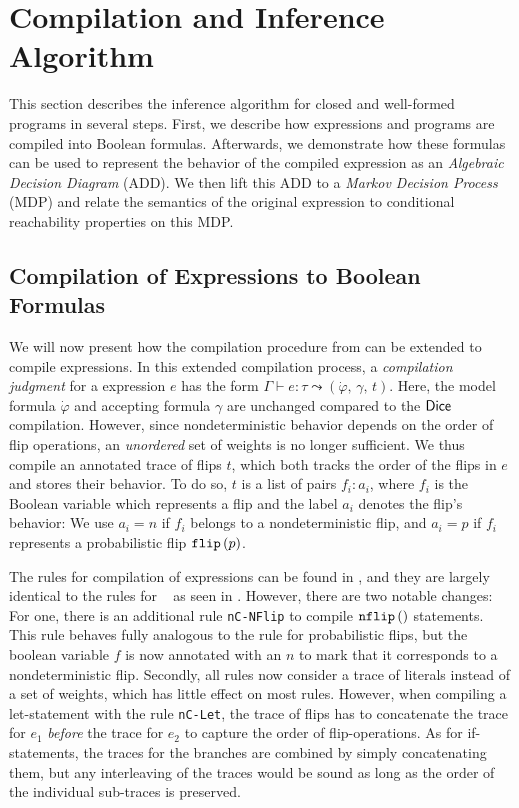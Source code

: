 


\section{Compilation and Inference Algorithm}\label{sec:inference}
This section describes the inference algorithm for closed and well-formed \NDICE programs in several steps.
First, we describe how \NDICE expressions and programs are compiled into Boolean formulas. 
Afterwards, we demonstrate how these formulas can be used to represent the behavior of the compiled expression as an \textit{Algebraic Decision Diagram} (ADD).
We then lift this ADD to a \textit{Markov Decision Process} (MDP) and relate the semantics of the original \NDICE expression to conditional reachability properties on this MDP.

\subsection{Compilation of \NDICE Expressions to Boolean Formulas}\label{sec:nDice_comp}

	\noindent
	We will now present how the \DICE compilation procedure from  can be extended to compile \NDICE expressions.
	In this extended compilation process, a \emph{compilation judgment} for a \NDICE expression $e$ has the form $\Gamma \vdash e \colon \tau \leadsto (\dot{\varphi},\, \gamma,\, t)$.  
	Here, the model formula $\dot{\varphi}$ and accepting formula $\gamma$ are unchanged compared to the $\textsf{\upshape {\mbox{Dice}}}$ compilation.
	However, since nondeterministic behavior depends on the order of flip operations, an \textit{unordered} set of weights is no longer sufficient.
	We thus compile an annotated trace of flips $t$, which both tracks the order of the flips in $e$ and stores their behavior.
	To do so, $t$ is a list of pairs $f_i\colon a_i$, where $f_i$ is the Boolean variable which represents a flip and the label $a_i$ denotes the flip's behavior:
	We use $a_i = n$ if $f_i$ belongs to a nondeterministic flip, and $a_i = p$ if $f_i$ represents a probabilistic flip $\texttt{flip} \left(p\right) $.
	
	The rules for \NDICE compilation of expressions can be found in , and they are largely identical to the rules for \DICE~\cite{holtzen2020scaling} as seen in .
	However, there are two notable changes:
	For one, there is an additional rule \texttt{nC-NFlip} to compile $\texttt{nflip}\left(\right) $ statements. 
	This rule behaves fully analogous to the rule for probabilistic flips, but the boolean variable $f$ is now annotated with an $n$ to mark that it corresponds to a nondeterministic flip.
	Secondly, all rules now consider a trace of literals instead of a set of weights, which has little effect on most rules.
	However, when compiling a let-statement with the rule \texttt{nC-Let}, the trace of flips has to concatenate the trace for $e_1$ \textit{before} the trace for $e_2$ to capture the order of flip-operations.
	As for if-statements, the traces for the branches are combined by simply concatenating them, but any interleaving of the traces would be sound as long as the order of the individual sub-traces is preserved.




